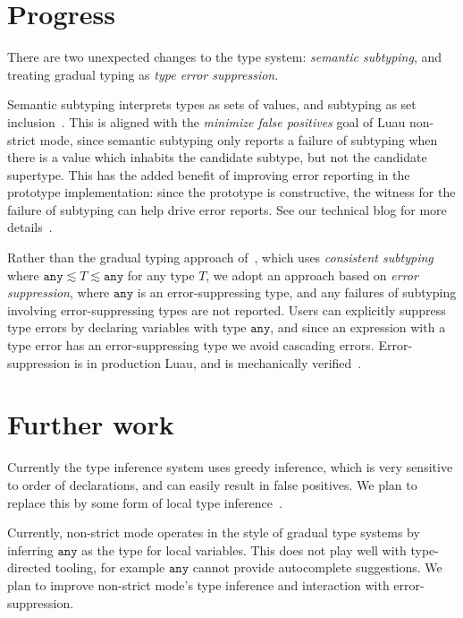 \documentclass[acmsmall]{acmart}
\newcommand{\ANY}{\mathtt{any}}
\begin{document}
\section{Progress}

There are two unexpected changes to the type system: \emph{semantic subtyping},
and treating gradual typing as \emph{type error suppression}.

Semantic subtyping
interprets types as sets of values, and subtyping as set
inclusion~\cite{GF05:GentleIntroduction}. This is aligned with the
\emph{minimize false positives} goal of Luau non-strict mode, since
semantic subtyping only reports a failure of subtyping when there is a
value which inhabits the candidate subtype, but not the candidate
supertype. This has the added benefit of improving error reporting in
the prototype implementation: since the prototype is constructive, the
witness for the failure of subtyping can help drive error reports.
See our technical blog for more details~\cite{Jef22:SemanticSubtyping}.

Rather than the gradual typing approach
of~\cite{ST07:GradualTyping}, which uses \emph{consistent
subtyping} where $\ANY \lesssim T \lesssim \ANY$ for any type $T$, we
adopt an approach based on \emph{error suppression}, where $\ANY$ is
an error-suppressing type, and any failures of subtyping involving
error-suppressing types are not reported. Users can explicitly
suppress type errors by declaring variables with type $\ANY$, and
since an expression with a type error has an error-suppressing type we
avoid cascading errors. Error-suppression is in production Luau, and is
mechanically verified~\cite{BJ23:agda-typeck}.

\section{Further work}

Currently the type inference system uses greedy inference, which is
very sensitive to order of declarations, and can easily result in
false positives. We plan to replace this by some form of local type
inference~\cite{PT00:LocalTypeInference}.

Currently, non-strict mode operates in the style of gradual type
systems by inferring $\ANY$ as the type for local variables. This does
not play well with type-directed tooling, for example $\ANY$ cannot
provide autocomplete suggestions. We plan to improve non-strict mode's
type inference and interaction with error-suppression.

 
\end{document}
